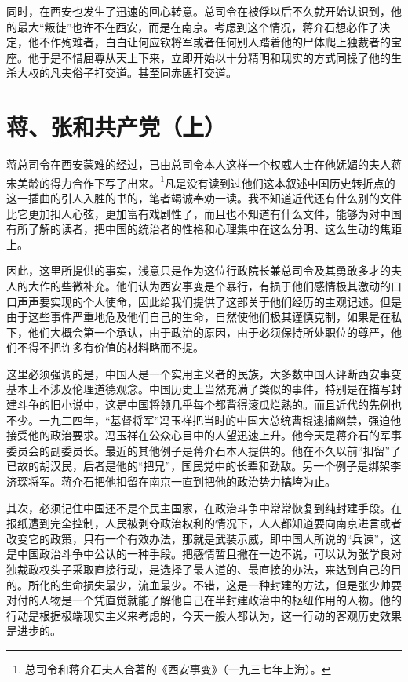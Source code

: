 \documentclass[10pt]{book}
\begin{document}
同时，在西安也发生了迅速的回心转意。总司令在被俘以后不久就开始认识到，他的最大“叛徒”也许不在西安，而是在南京。考虑到这个情况，蒋介石想必作了决定，他不作殉难者，白白让何应钦将军或者任何别人踏着他的尸体爬上独裁者的宝座。他于是不惜屈尊从天上下来，立即开始以十分精明和现实的方式同操了他的生杀大权的凡夫俗子打交道。甚至同赤匪打交道。



\section{蒋、张和共产党（上）}

蒋总司令在西安蒙难的经过，已由总司令本人这样一个权威人士在他妩媚的夫人蒋宋美龄的得力合作下写了出来。\footnote{总司令和蒋介石夫人合著的《西安事变》（一九三七年上海）。}凡是没有读到过他们这本叙述中国历史转折点的这一插曲的引人入胜的书的，笔者竭诚奉劝一读。我不知道近代还有什么别的文件比它更加扣人心弦，更加富有戏剧性了，而且也不知道有什么文件，能够为对中国有所了解的读者，把中国的统治者的性格和心理集中在这么分明、这么生动的焦距上。

因此，这里所提供的事实，浅意只是作为这位行政院长兼总司令及其勇敢多才的夫人的大作的些微补充。他们认为西安事变是个暴行，有损于他们感情极其激动的口口声声要实现的个人使命，因此给我们提供了这部关于他们经历的主观记述。但是由于这些事件严重地危及他们自己的生命，自然使他们极其谨慎克制，如果是在私下，他们大概会第一个承认，由于政治的原因，由于必须保持所处职位的尊严，他们不得不把许多有价值的材料略而不提。

这里必须强调的是，中国人是一个实用主义者的民族，大多数中国人评断西安事变基本上不涉及伦理道德观念。中国历史上当然充满了类似的事件，特别是在描写封建斗争的旧小说中，这是中国将领几乎每个都背得滚瓜烂熟的。而且近代的先例也不少。一九二四年，“基督将军”冯玉祥把当时的中国大总统曹锟逮捕幽禁，强迫他接受他的政治要求。冯玉祥在公众心目中的人望迅速上升。他今天是蒋介石的军事委员会的副委员长。最近的其他例子是蒋介石本人提供的。他在不久以前“扣留”了已故的胡汉民，后者是他的“把兄”，国民党中的长辈和劲敌。另一个例子是绑架李济琛将军。蒋介石把他扣留在南京一直到把他的政治势力搞垮为止。

其次，必须记住中国还不是个民主国家，在政治斗争中常常恢复到纯封建手段。在报纸遭到完全控制，人民被剥夺政治权利的情况下，人人都知道要向南京进言或者改变它的政策，只有一个有效办法，那就是武装示威，即中国人所说的“兵谏”，这是中国政治斗争中公认的一种手段。把感情暂且撇在一边不说，可以认为张学良对独裁政权头子采取直接行动，是选择了最人道的、最直接的办法，来达到自己的目的。所化的生命损失最少，流血最少。不错，这是一种封建的方法，但是张少帅要对付的人物是一个凭直觉就能了解他自己在半封建政治中的枢纽作用的人物。他的行动是根据极端现实主义来考虑的，今天一般人都认为，这一行动的客观历史效果是进步的。
\end{document}
